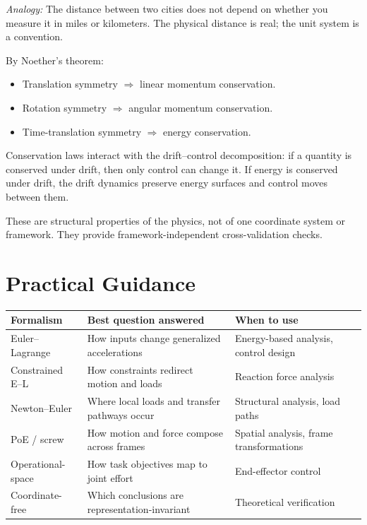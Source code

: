 \documentclass[11pt]{article}
\begin{document}
\textit{Analogy:} The distance between two cities does not depend on whether you measure it in miles or kilometers. The physical distance is real; the unit system is a convention.

By Noether's theorem:
\begin{itemize}
\item Translation symmetry $\Rightarrow$ linear momentum conservation.
\item Rotation symmetry $\Rightarrow$ angular momentum conservation.
\item Time-translation symmetry $\Rightarrow$ energy conservation.
\end{itemize}

Conservation laws interact with the drift--control decomposition: if a quantity is conserved under drift, then only control can change it. If energy is conserved under drift, the drift dynamics preserve energy surfaces and control moves between them.

These are structural properties of the physics, not of one coordinate system or framework. They provide framework-independent cross-validation checks.


\section{Practical Guidance}\label{sec:practical}

\begin{center}
\small
\renewcommand{\arraystretch}{1.2}
\begin{tabularx}{\textwidth}{>{\raggedright\arraybackslash}p{3.1cm}Y Y}
\toprule
Formalism & Best question answered & When to use \\
\midrule
Euler--Lagrange & How inputs change generalized accelerations & Energy-based analysis, control design \\
\midrule
Constrained E--L & How constraints redirect motion and loads & Reaction force analysis \\
\midrule
Newton--Euler & Where local loads and transfer pathways occur & Structural analysis, load paths \\
\midrule
PoE / screw & How motion and force compose across frames & Spatial analysis, frame transformations \\
\midrule
Operational-space & How task objectives map to joint effort & End-effector control \\
\midrule
Coordinate-free & Which conclusions are representation-invariant & Theoretical verification \\
\bottomrule
\end{tabularx}
\end{center}
\end{document}
